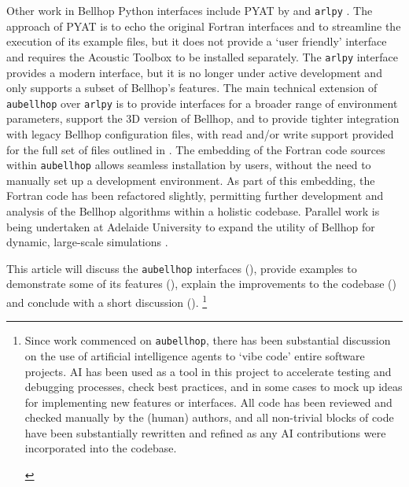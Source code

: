 \documentclass{internoise2026-wr}
\begin{document}
Other work in Bellhop Python interfaces include PYAT by \textcite{rodriguez2026-pyat} and \texttt{arlpy} \textcite{chitre2025-arlpy}.
The approach of PYAT is to echo the original Fortran interfaces and to streamline the execution of its example files, but it does not provide a `user friendly' interface and requires the Acoustic Toolbox to be installed separately.
The \texttt{arlpy} interface provides a modern interface, but it is no longer under active development and only supports a subset of Bellhop's features.
The main technical extension of \texttt{aubellhop} over \texttt{arlpy} is to provide interfaces for a broader range of environment parameters, support the 3D version of Bellhop, and to provide tighter integration with legacy Bellhop configuration files, with read and/or write support provided for the full set of files outlined in .
The embedding of the Fortran code sources within \texttt{aubellhop} allows seamless installation by users, without the need to manually set up a development environment.
As part of this embedding, the Fortran code has been refactored slightly, permitting further development and analysis of the Bellhop algorithms within a holistic codebase.
Parallel work is being undertaken at Adelaide University to expand the utility of Bellhop for dynamic, large-scale simulations \cite{fang2024-aas,fang2025-aas,fang2026-internoise}.

This article will discuss the \texttt{aubellhop} interfaces (), provide examples to demonstrate some of its features (), explain the improvements to the codebase () and conclude with a short discussion ().%
\footnote{\begin{em}
Since work commenced on \texttt{aubellhop}, there has been substantial discussion on the use of artificial intelligence agents to `vibe code' entire software projects.
AI has been used as a tool in this project to accelerate testing and debugging processes, check best practices, and in some cases to mock up ideas for implementing new features or interfaces.
All code has been reviewed and checked manually by the (human) authors, and all non-trivial blocks of code have been substantially rewritten and refined as any AI contributions were incorporated into the codebase.
\end{em}}
\end{document}
